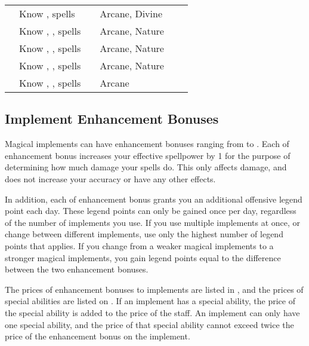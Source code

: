 \begin{longtabuwrapper}
\begin{longtabu}{l X l l l l}
                 & Know ,  spells &  & Arcane, Divine &  \\
                 & Know , ,  spells &  & Arcane, Nature &  \\
                 & Know , ,  spells &  & Arcane, Nature &  \\
                 & Know , ,  spells &  & Arcane, Nature &  \\
                 & Know , ,  spells &  & Arcane &  \\
            \end{longtabu}
        \end{longtabuwrapper}
        \twocolumn

    \subsection{Implement Enhancement Bonuses}\label{Implement Enhancement Bonuses}

        Magical implements can have enhancement bonuses ranging from  to .
        Each  of enhancement bonus increases your effective spellpower by 1 for the purpose of determining how much damage your spells do.
        This only affects damage, and does not increase your accuracy or have any other effects.

        In addition, each  of enhancement bonus grants you an additional offensive legend point each day.
        These legend points can only be gained once per day, regardless of the number of implements you use.
        If you use multiple implements at once, or change between different implements, use only the highest number of legend points that applies.
        If you change from a weaker magical implements to a stronger magical implements, you gain legend points equal to the difference between the two enhancement bonuses.

         The prices of enhancement bonuses to implements are listed in , and the prices of special abilities are listed on .
        If an implement has a special ability, the price of the special ability is added to the price of the staff.
        An implement can only have one special ability, and the price of that special ability cannot exceed twice the price of the enhancement bonus on the implement.

